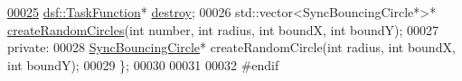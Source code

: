 \begin{DoxyCode}
\hypertarget{_bouncing_circle_manager_8h_source_l00025}{}\hyperlink{class_bouncing_circle_manager_aee82e3ddd983f4e27c439b74494ab3d5}{00025}     \hyperlink{namespacedsf_aa16e735f29587f4485b56fc46746f7a9}{dsf::TaskFunction}* \hyperlink{class_bouncing_circle_manager_aee82e3ddd983f4e27c439b74494ab3d5}{destroy};
00026     std::vector<SyncBouncingCircle*>* \hyperlink{class_bouncing_circle_manager_aa88c537cbffc870d5def5bcacd3c5ee2}{createRandomCircles}(\textcolor{keywordtype}{int} number, \textcolor{keywordtype}{int} radius, \textcolor{keywordtype}{int} 
      boundX, \textcolor{keywordtype}{int} boundY);
00027 \textcolor{keyword}{private}:
00028     \hyperlink{class_sync_bouncing_circle}{SyncBouncingCircle}* createRandomCircle(\textcolor{keywordtype}{int} radius, \textcolor{keywordtype}{int} boundX, \textcolor{keywordtype}{int} boundY);
00029 \};
00030 
00031 
00032 \textcolor{preprocessor}{#endif}
\end{DoxyCode}
